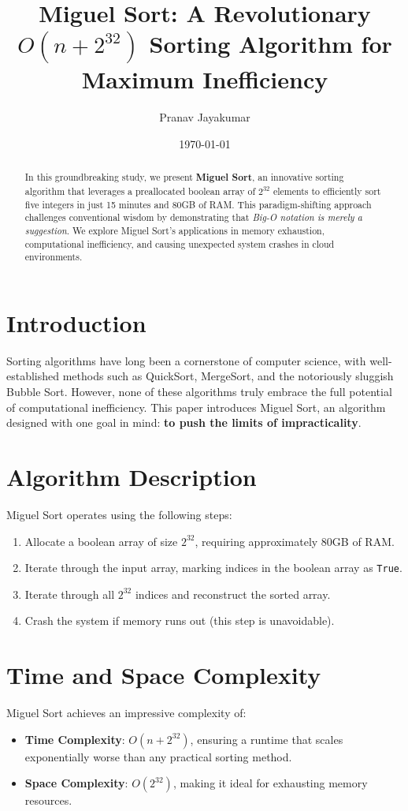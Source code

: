\documentclass{article}
\title{Miguel Sort: A Revolutionary $O(n + 2^{32})$ Sorting Algorithm for Maximum Inefficiency}
\author{Pranav Jayakumar}
\date{\today}
\begin{document}
\maketitle

\begin{abstract}
    In this groundbreaking study, we present \textbf{Miguel Sort}, an innovative sorting algorithm that leverages a preallocated boolean array of \( 2^{32} \) elements to efficiently sort five integers in just 15 minutes and 80GB of RAM. This paradigm-shifting approach challenges conventional wisdom by demonstrating that \textit{Big-O notation is merely a suggestion}. We explore Miguel Sort’s applications in memory exhaustion, computational inefficiency, and causing unexpected system crashes in cloud environments.
\end{abstract}

\section{Introduction}
Sorting algorithms have long been a cornerstone of computer science, with well-established methods such as QuickSort, MergeSort, and the notoriously sluggish Bubble Sort. However, none of these algorithms truly embrace the full potential of computational inefficiency. This paper introduces Miguel Sort, an algorithm designed with one goal in mind: \textbf{to push the limits of impracticality}.

\section{Algorithm Description}
Miguel Sort operates using the following steps:
\begin{enumerate}
    \item Allocate a boolean array of size \(2^{32}\), requiring approximately 80GB of RAM.
    \item Iterate through the input array, marking indices in the boolean array as \texttt{True}.
    \item Iterate through all \(2^{32}\) indices and reconstruct the sorted array.
    \item Crash the system if memory runs out (this step is unavoidable).
\end{enumerate}

\section{Time and Space Complexity}
Miguel Sort achieves an impressive complexity of:
\begin{itemize}
    \item \textbf{Time Complexity}: \(O(n + 2^{32})\), ensuring a runtime that scales exponentially worse than any practical sorting method.
    \item \textbf{Space Complexity}: \(O(2^{32})\), making it ideal for exhausting memory resources.
\end{itemize}
\end{document}
